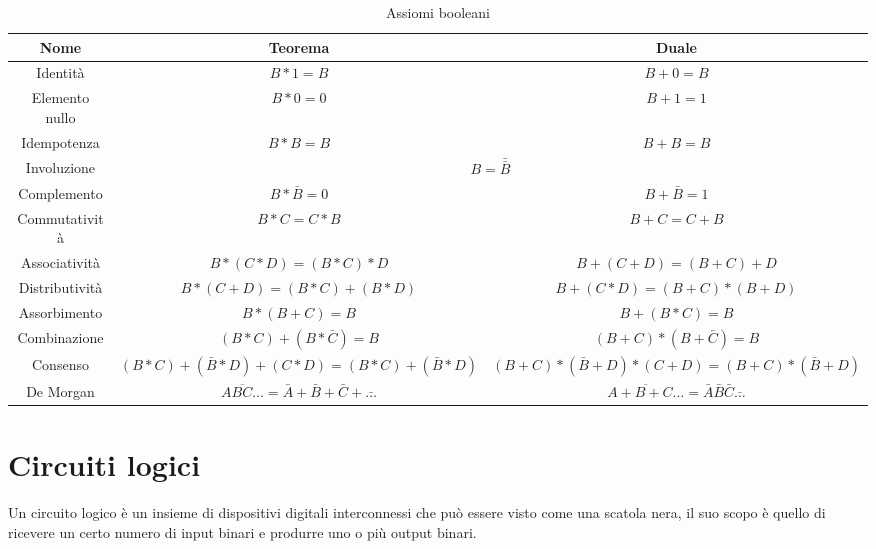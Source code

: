 \documentclass{article}
\begin{document}
\begin{table}[H]
    \begin{adjustwidth}{-3.5cm}{}
    \begin{tabular}{|c|c|c|}
    \hline
        Nome & Teorema & Duale\\
         \hline
        \rule{0pt}{3ex}Identità & $B*1=B$ & $B+0=B$\\
         \hline
        \rule{0pt}{3ex}Elemento nullo & $B*0=0$ & $B+1=1$\\
         \hline
        \rule{0pt}{3ex}Idempotenza & $B*B=B$ & $B+B=B$\\
         \hline
        \rule{0pt}{3ex}Involuzione & \multicolumn{2}{c|}{$B = \bar{\bar{B}}$}\\
         \hline
        \rule{0pt}{3ex}Complemento & $B*\bar{B}=0$ & $B+\bar{B}=1$\\
         \hline
        \rule{0pt}{3ex}Commutatività & $B*C=C*B$ & $B+C=C+B$\\
         \hline
        \rule{0pt}{3ex}Associatività & $B*(C*D) = (B*C)*D$ & $B+(C+D) = (B+C)+D$\\
         \hline
         \rule{0pt}{3ex}Distributività & $B*(C+D) = (B*C)+(B*D)$ & $B+(C*D) = (B+C)*(B+D)$\\
         \hline
        \rule{0pt}{3ex}Assorbimento & $B*(B+C)=B$ & $B+(B*C)=B$\\
         \hline
        \rule{0pt}{3ex}Combinazione & $(B*C)+(B*\bar{C})=B$ & $(B+C)*(B+\bar{C})=B$\\
         \hline
        \rule{0pt}{3ex}Consenso & $(B*C)+(\bar{B}*D)+(C*D)=(B*C)+(\bar{B}*D)$ & $(B+C)*(\bar{B}+D)*(C+D)=(B+C)*(\bar{B}+D)$\\
         \hline
         \rule{0pt}{3ex}De Morgan & $\overline{ABC\ldots} = \bar{A}+\bar{B}+\bar{C}+\bar{\ldots}$ & $\overline{A+B+C\ldots} = \bar{A}\bar{B}\bar{C}\bar{\ldots}$\\
         \hline
    \end{tabular}
    \end{adjustwidth}
    \caption{Assiomi booleani}
    \label{tab:bool_axiom}
\end{table}

\section{Circuiti logici}

Un circuito logico è un insieme di dispositivi digitali interconnessi che può essere visto come una scatola nera, il suo scopo è quello di ricevere un certo numero di input binari e produrre uno o più output binari.\newline
\end{document}
